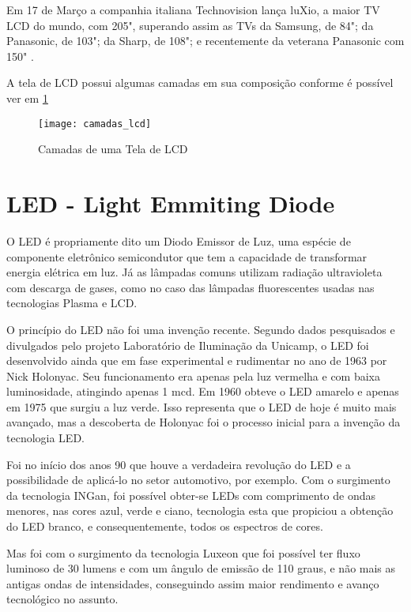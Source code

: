 Em 17 de Março a companhia italiana Technovision lança luXio, a maior TV LCD do mundo, com 205", superando assim as TVs da Samsung, de 84"; da Panasonic, de 103"; da Sharp, de 108"; e recentemente da veterana Panasonic com 150" \cite{WikipediaLCD}. 

A tela de LCD possui algumas camadas em sua composição conforme é possível ver em \ref{fig:camadas_lcd}

\begin{figure}[!h]
  \centering
  \texttt{[image: camadas\_lcd]} 
  \caption{Camadas de uma Tela de LCD}
  \label{fig:camadas_lcd} 
\end{figure}


\section{LED - Light Emmiting Diode}
\label{sec:led}

O LED é propriamente dito um Diodo Emissor de Luz, uma espécie de componente eletrônico semicondutor que tem a capacidade de transformar energia elétrica em luz. Já as lâmpadas comuns utilizam radiação ultravioleta com descarga de gases, como no caso das lâmpadas fluorescentes usadas nas tecnologias Plasma e LCD. 

O princípio do LED não foi uma invenção recente. Segundo dados pesquisados e divulgados pelo projeto Laboratório de Iluminação da Unicamp, o LED foi desenvolvido ainda que em fase experimental e rudimentar no ano de 1963 por Nick Holonyac. Seu funcionamento era apenas pela luz vermelha e com baixa luminosidade, atingindo apenas 1 mcd. Em 1960 obteve o LED amarelo e apenas em 1975 que surgiu a luz verde. Isso representa que o LED de hoje é muito mais avançado, mas a descoberta de Holonyac foi o processo inicial para a invenção da tecnologia LED.

Foi no início dos anos 90 que houve a verdadeira revolução do LED e a possibilidade de aplicá-lo no setor automotivo, por exemplo. Com o surgimento da tecnologia INGan, foi possível obter-se LEDs com comprimento de ondas menores, nas cores azul, verde e ciano, tecnologia esta que propiciou a obtenção do LED branco, e consequentemente, todos os espectros de cores.

Mas foi com o surgimento da tecnologia Luxeon que foi possível ter fluxo luminoso de 30 lumens e com um ângulo de emissão de 110 graus, e não mais as antigas ondas de intensidades, conseguindo assim maior rendimento e avanço tecnológico no assunto.

